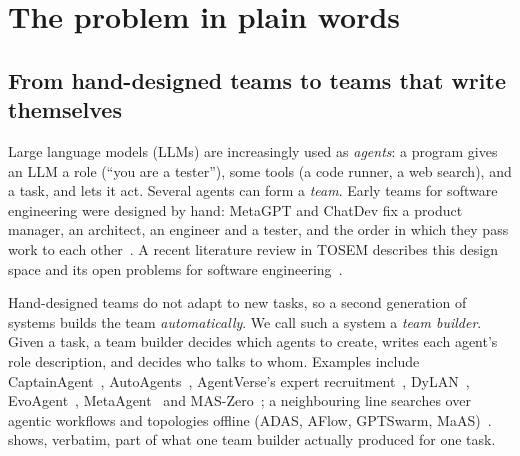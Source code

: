 \documentclass[10pt,a4paper]{article}
\begin{document}
\section{The problem in plain words}\label{sec:plain}

\subsection{From hand-designed teams to teams that write themselves}

Large language models (LLMs) are increasingly used as \emph{agents}: a
program gives an LLM a role (``you are a tester''), some tools (a code
runner, a web search), and a task, and lets it act. Several agents can form
a \emph{team}. Early teams for software engineering were designed by hand:
MetaGPT and ChatDev fix a product manager, an architect, an engineer and a
tester, and the order in which they pass work to each
other~\cite{hong2024metagpt,qian2024chatdev,dong2024selfcollab}. A recent
literature review in TOSEM describes this design space and its open
problems for software engineering~\cite{he2025lma}.

Hand-designed teams do not adapt to new tasks, so a second generation of
systems builds the team \emph{automatically}. We call such a system a
\emph{team builder}. Given a task, a team builder decides which agents to
create, writes each agent's role description, and decides who talks to
whom. Examples include CaptainAgent~\cite{song2024captain},
AutoAgents~\cite{chen2024autoagents}, AgentVerse's expert
recruitment~\cite{chen2024agentverse}, DyLAN~\cite{liu2024dylan},
EvoAgent~\cite{yuan2025evoagent}, MetaAgent~\cite{zhang2025metaagent} and
MAS-Zero~\cite{ke2025maszero}; a neighbouring line searches over agentic
workflows and topologies offline (ADAS, AFlow, GPTSwarm,
MaAS)~\cite{hu2025adas,zhang2025aflow,zhuge2024gptswarm,zhang2025maas}.
 shows, verbatim, part of what one team builder actually
produced for one task.
\end{document}
